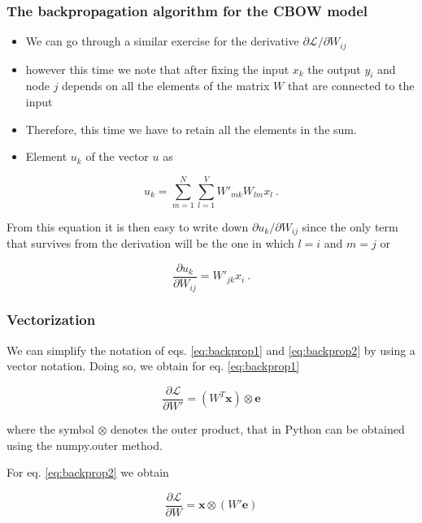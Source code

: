 \begin{frame}[fragile]\frametitle{The backpropagation algorithm for the CBOW model}

  \begin{itemize}
    \item We can go through a similar exercise for the derivative $\partial\mathcal{L}/\partial W_{ij}$
	\item however this time we note that after fixing the input $x_k$ 
the output $y_i$ and node $j$ depends on all the elements of the matrix $W$ that are connected to the input
\item Therefore, this time we have to retain all the elements in the sum. 
\item Element $u_k$ of the vector $u$ as 
\end{itemize}

  \begin{equation*}
u_k = \sum_{m=1}^N\sum_{l=1}^VW'_{mk}W_{lm}x_l\ .
\end{equation*}

From this equation it is then easy to write down $\partial u_k/\partial W_{ij}$
since the only term that survives from the derivation will be the one in which $l=i$ and $m=j$ or 

\begin{equation}
\frac{\partial u_k}{\partial W_{ij}} = W'_{jk}x_i\  .
\label{eq:term}
\end{equation}

\end{frame}



\begin{frame}[fragile]\frametitle{Vectorization}
We can simplify the notation of eqs. \ref{eq:backprop1} and \ref{eq:backprop2} by using a vector notation. Doing so, we obtain for eq. \ref{eq:backprop1}

\begin{equation}
\frac{\partial\mathcal{L}}{\partial W'} =  (W^T\textbf{x}) \otimes \textbf{e}
\end{equation}

where the symbol $\otimes$ denotes the outer product, that in Python can be obtained using the numpy.outer method.

For eq. \ref{eq:backprop2} we obtain

\begin{equation}
\frac{\partial \mathcal{L}}{\partial W} = \textbf{x}\otimes(W'\textbf{e})
\end{equation}

 
\end{frame}

